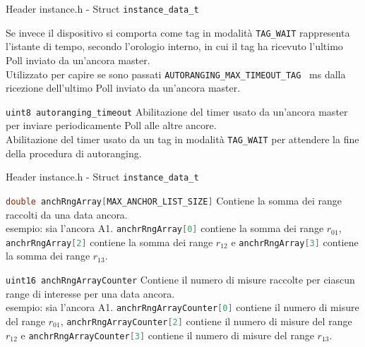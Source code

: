 \begin{frame}[fragile]{Header instance.h - Struct \lstinline[language=C]!instance_data_t!}
  \begin{block}{}
    Se invece il dispositivo si comporta come tag in modalità \lstinline[language=C]!TAG_WAIT! rappresenta l'istante di tempo, secondo l'orologio
    interno, in cui il tag ha ricevuto l'ultimo Poll inviato da un'ancora master.\\
    Utilizzato per capire se sono passati \lstinline[language=C]!AUTORANGING_MAX_TIMEOUT_TAG! \SI{}{\milli\second} dalla ricezione
    dell'ultimo Poll inviato da un'ancora master.
  \end{block}
  \begin{block}{\lstinline[language=C]!uint8 autoranging_timeout!}
    Abilitazione del timer usato da un'ancora master per inviare periodicamente Poll alle altre ancore.\\
    Abilitazione del timer usato da un tag in modalità \lstinline[language=C]!TAG_WAIT! per attendere la fine della
    procedura di autoranging.
  \end{block}
\end{frame}

\begin{frame}[fragile]{Header instance.h - Struct \lstinline[language=C]!instance_data_t!}
  \begin{block}{\lstinline[language=C]!double anchRngArray[MAX_ANCHOR_LIST_SIZE]!}
    Contiene la somma dei range raccolti da una data ancora.\\
    \textcolor{dgreen}{esempio:} sia l'ancora A1. \lstinline[language=C]!anchrRngArray[0]! contiene la somma dei range $r_{01}$,
    \lstinline[language=C]!anchrRngArray[2]! contiene la somma dei range $r_{12}$ e \lstinline[language=C]!anchrRngArray[3]! contiene la somma dei range $r_{13}$.
  \end{block}
  \begin{block}{\lstinline[language=C]!uint16 anchRngArrayCounter!}
    Contiene il numero di misure raccolte per ciascun range di interesse per una data ancora.\\
    \textcolor{dgreen}{esempio:} sia l'ancora A1. \lstinline[language=C]!anchrRngArrayCounter[0]! contiene il numero di misure del range $r_{01}$,
    \lstinline[language=C]!anchrRngArrayCounter[2]! contiene il numero di misure del range $r_{12}$ e \lstinline[language=C]!anchrRngArrayCounter[3]! contiene il numero di misure del range $r_{13}$.
  \end{block}
\end{frame}

